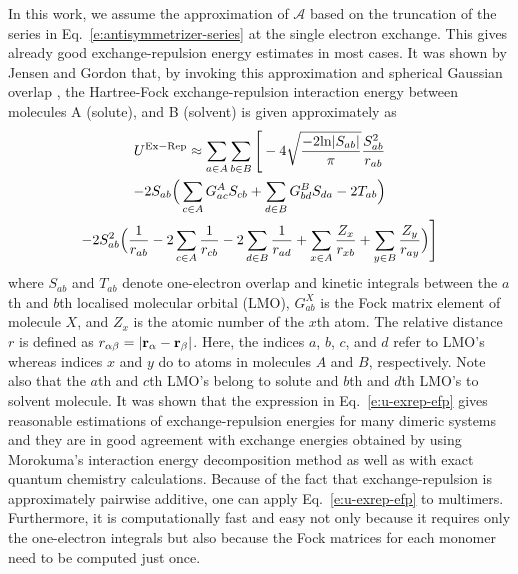 \documentclass[b5paper,oneside,fleqn,11pt]{book}
\begin{document}
\begin{refsection}
In this work, we assume the approximation of $\mathscr{A}$
based on the truncation of the series in Eq.~\eqref{e:antisymmetrizer-series}
at the single electron exchange. This gives already good exchange\hyp{}repulsion
energy estimates in most cases. It was shown by 
Jensen and Gordon \citep{Jensen.Gordon.JCP.1998,Jensen.Gordon.MolPhys.1996}
that, by invoking this
approximation and spherical Gaussian overlap \citep{Jensen.JCP.1996}, 
the Hartree\hyp{}Fock exchange\hyp{}repulsion interaction energy 
between molecules A (solute), and B (solvent) is given approximately as 
%
\begin{multline}\label{e:u-exrep-efp}
U^{\rm Ex-Rep} \approx \sum_{a \in A}\sum_{b \in B} \Bigg[
-4\sqrt{\frac{-2{\rm ln}|S_{ab}|}{\pi}} \frac{S_{ab}^2}{r_{ab}} 
\\-
2S_{ab} \Big( \sum_{c \in A} G^A_{ac} S_{cb} + 
\sum_{d \in B} G^B_{bd} S_{da} - 2 T_{ab} \Big)  \\
-2S^2_{ab} \Big( \frac{1}{r_{ab}} 
- 2\sum_{c \in A} \frac{1}{r_{cb}} 
- 2\sum_{d \in B} \frac{1}{r_{ad}}
+ \sum_{x \in A} \frac{Z_x}{r_{xb}} 
+ \sum_{y \in B} \frac{Z_y}{r_{ay}}  
\Big)
\Bigg]
\end{multline}
%
where $S_{ab}$ and $T_{ab}$ denote one\hyp{}electron overlap and kinetic integrals 
between the $a$th and $b$th localised molecular orbital (LMO), 
$G^X_{ab}$ is the Fock matrix element of molecule 
$X$, and $Z_x$ is the atomic number of the $x$th atom. 
The relative distance $r$ is defined as $r_{\alpha\beta} = \left|{\bf r}_\alpha - {\bf r}_\beta \right|$. 
Here, the indices $a$, $b$, $c$, and $d$ refer to LMO's whereas indices $x$ and $y$ 
do to atoms in molecules $A$ and $B$, respectively. Note also that the $a$th 
and $c$th LMO's belong to solute and $b$th and $d$th LMO's to solvent molecule. 
It was shown \citep{Jensen.Gordon.JCP.1998,Jensen.Gordon.MolPhys.1996,Kemp.Rintelman.Gordon.Jensen.TheoretChemAcc.2009} 
that the expression in Eq.~\eqref{e:u-exrep-efp} gives reasonable 
estimations of exchange\hyp{}repulsion energies for many dimeric systems 
and they are in good agreement with exchange energies obtained 
by using Morokuma's interaction energy decomposition 
method \citep{Kitaura.Morokuma.IJQC.1976} 
as well as 
with exact quantum chemistry calculations. Because of the fact that 
exchange\hyp{}repulsion is approximately pairwise 
additive, \citep{Chen.Li.JPCA.2010,Chen.Gordon.JCP.1996,Jens.Bruske.Grimme.PCCP.2009,
Gora.Sokalski.Leszczynski.Pett.JPCB.2005,Chaudret.Gresh.Parisel.Piquemel.JCC.2011} 
one can 
apply Eq.~\eqref{e:u-exrep-efp} to multimers. Furthermore, it is computationally fast 
and easy not only because it requires only the one\hyp{}electron integrals 
but also because the Fock matrices for each monomer need to be computed just once.


\end{refsection}
\end{document}
